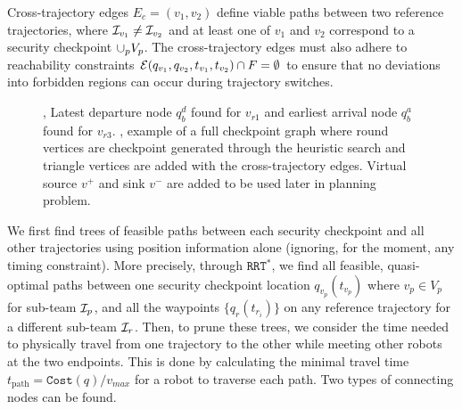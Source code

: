 \documentclass[10pt,twocolumn,twoside]{IEEEtran}
\newcommand{\rrtstar}{$\texttt{RRT}^\texttt{*}$}
\begin{document}
Cross-trajectory edges $E_c = (v_1, v_2)$ define viable paths between two reference trajectories, where $\mathcal{I}_{v_1}\neq\mathcal{I}_{v_2}$ and at least one of $v_1 $ and $v_2$ correspond to a security checkpoint $\cup_p V_p$. The cross-trajectory edges must also adhere to reachability constraints $\mathcal{E}(q_{v_1}, q_{v_2}, t_{v_1},t_{v_2}) \cap F = \emptyset$ to ensure that no deviations into forbidden regions can occur during trajectory switches.  

\begin{figure}[htbp]
    \centering
  \caption{, Latest departure node $q^{d}_{b}$ found for $v_{r1}$ and earliest arrival node $q^{a}_{b}$ found for $v_{r3}$. , example of a full checkpoint graph where round vertices are checkpoint generated through the heuristic search and triangle vertices are added with the cross-trajectory edges. Virtual source $v^{+}$ and sink $v^{-}$ are added to be used later in planning problem.}  
\end{figure}


We first find trees of feasible paths between each security checkpoint and all other trajectories using position information alone (ignoring, for the moment, any timing constraint). 
More precisely, through \rrtstar{}, we find all feasible, quasi-optimal paths between one security checkpoint location $q_{v_p}(t_{v_p})$ where $v_{p} \in V_{p}$ for sub-team $\mathcal{I}_p$, and all the waypoints $\{q_{r}(t_{{r}_{i}}) \}$ on any reference trajectory for a different sub-team $\mathcal{I}_{r}$.
Then, to prune these trees, we consider the time needed to physically travel from one trajectory to the other while meeting other robots at the two endpoints. This is done by calculating the minimal travel time $t_{\textrm{path}}=\texttt{Cost}(q)/v_{max}$ for a robot to traverse each path. Two types of connecting nodes can be found.
\end{document}
